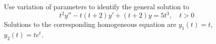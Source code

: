 \documentclass[12pt]{exam}
\begin{document}
\begin{questions}

    \newpage \InitialsLeft


    \question[10] Use variation of parameters to identify the general solution to $$t^2 y'' - t(t+2)y' + (t+2)y = 5t^3, \quad t > 0$$ Solutions to the corresponding homogeneous equation are $y_1(t) = t$, $y_2(t) = te^t$.
    

    
    
\end{questions}
    
\newpage \LastPage 
\end{document}
